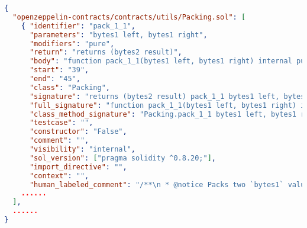 \begin{figure*}[htbp]
\centering
\begin{lstlisting}[language=json, firstnumber=1, xleftmargin=2.0ex]
{
  "openzeppelin-contracts/contracts/utils/Packing.sol": [
    { "identifier": "pack_1_1",
      "parameters": "bytes1 left, bytes1 right",
      "modifiers": "pure",
      "return": "returns (bytes2 result)",
      "body": "function pack_1_1(bytes1 left, bytes1 right) internal pure returns (bytes2 result) {\n        assembly (\"memory-safe\") {\n            left := and(left, shl(248, not(0)))\n            right := and(right, shl(248, not(0)))\n            result := or(left, shr(8, right))\n        }\n    }",
      "start": "39",
      "end": "45",
      "class": "Packing",
      "signature": "returns (bytes2 result) pack_1_1 bytes1 left, bytes1 right",
      "full_signature": "function pack_1_1(bytes1 left, bytes1 right) internal pure returns (bytes2 result)",
      "class_method_signature": "Packing.pack_1_1 bytes1 left, bytes1 right",
      "testcase": "",
      "constructor": "False",
      "comment": "",
      "visibility": "internal",
      "sol_version": ["pragma solidity ^0.8.20;"],
      "import_directive": "",
      "context": "",
      "human_labeled_comment": "/**\n * @notice Packs two `bytes1` values into a single `bytes2` value.\n *\n * @param left The first `bytes1` value to be packed.\n ......*/",},
    ......
  ],
  ......
}
\end{lstlisting}
\caption{A short example of \texttt{dataset.json}}
\label{fig:dataset.json}
\end{figure*}



